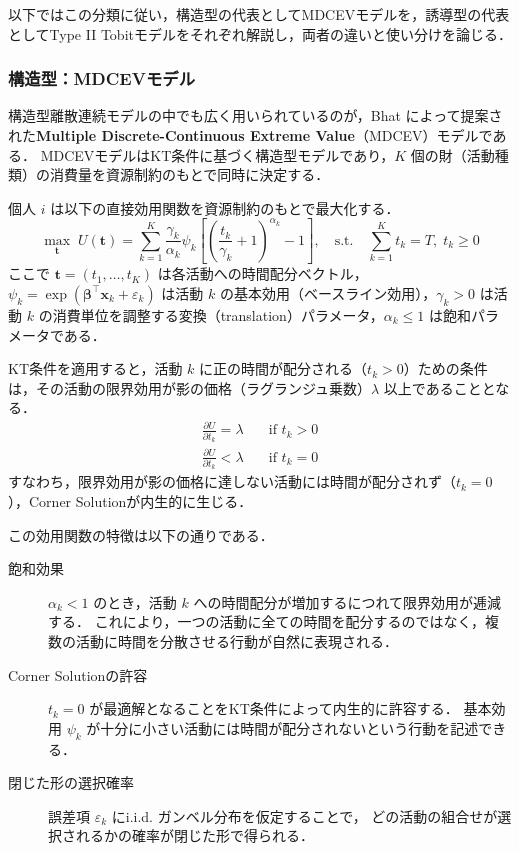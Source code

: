 以下ではこの分類に従い，構造型の代表としてMDCEVモデルを，誘導型の代表としてType II Tobitモデルをそれぞれ解説し，両者の違いと使い分けを論じる．

\subsubsection{構造型：MDCEVモデル}

構造型離散連続モデルの中でも広く用いられているのが，Bhat \cite{BHAT2008274} によって提案された\textbf{Multiple Discrete-Continuous Extreme Value}（MDCEV）モデルである．
MDCEVモデルはKT条件に基づく構造型モデルであり，$K$ 個の財（活動種類）の消費量を資源制約のもとで同時に決定する．

個人 $i$ は以下の直接効用関数を資源制約のもとで最大化する．
\begin{equation}\label{eq:mdcev_utility}
  \max_{\bm{t}} \; U(\bm{t}) = \sum_{k=1}^{K} \frac{\gamma_k}{\alpha_k} \psi_k \left[ \left( \frac{t_k}{\gamma_k} + 1 \right)^{\alpha_k} - 1 \right], \quad \text{s.t.} \quad \sum_{k=1}^{K} t_k = T, \; t_k \geq 0
\end{equation}
ここで $\bm{t} = (t_1, \dots, t_K)$ は各活動への時間配分ベクトル，$\psi_k = \exp(\bm{\beta}^\top \bm{x}_k + \varepsilon_k)$ は活動 $k$ の基本効用（ベースライン効用），$\gamma_k > 0$ は活動 $k$ の消費単位を調整する変換（translation）パラメータ，$\alpha_k \le 1$ は飽和パラメータである．

KT条件を適用すると，活動 $k$ に正の時間が配分される（$t_k > 0$）ための条件は，その活動の限界効用が影の価格（ラグランジュ乗数）$\lambda$ 以上であることとなる．
\begin{align}
  \frac{\partial U}{\partial t_k} = \lambda &\quad \text{if } t_k > 0 \label{eq:mdcev_kt_interior} \\
  \frac{\partial U}{\partial t_k} < \lambda &\quad \text{if } t_k = 0 \label{eq:mdcev_kt_corner}
\end{align}
すなわち，限界効用が影の価格に達しない活動には時間が配分されず（$t_k = 0$），Corner Solutionが内生的に生じる．

この効用関数の特徴は以下の通りである．
\begin{description}
  \item[飽和効果]
    $\alpha_k < 1$ のとき，活動 $k$ への時間配分が増加するにつれて限界効用が逓減する．
    これにより，一つの活動に全ての時間を配分するのではなく，複数の活動に時間を分散させる行動が自然に表現される．
  \item[Corner Solutionの許容]
    $t_k = 0$ が最適解となることをKT条件によって内生的に許容する．
    基本効用 $\psi_k$ が十分に小さい活動には時間が配分されないという行動を記述できる．
  \item[閉じた形の選択確率]
    誤差項 $\varepsilon_k$ にi.i.d. ガンベル分布を仮定することで，
    どの活動の組合せが選択されるかの確率が閉じた形で得られる．
\end{description}


